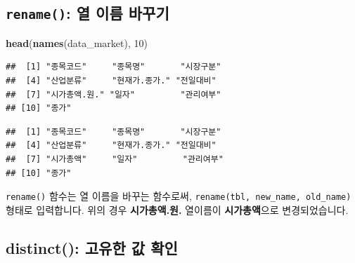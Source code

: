 \documentclass[12pt,]{book}
\newenvironment{Shaded}{\begin{snugshade}}{\end{snugshade}}
\newcommand{\DataTypeTok}[1]{\textcolor[rgb]{0.13,0.29,0.53}{#1}}
\newcommand{\DecValTok}[1]{\textcolor[rgb]{0.00,0.00,0.81}{#1}}
\newcommand{\KeywordTok}[1]{\textcolor[rgb]{0.13,0.29,0.53}{\textbf{#1}}}
\newcommand{\NormalTok}[1]{#1}
\newcommand{\OperatorTok}[1]{\textcolor[rgb]{0.81,0.36,0.00}{\textbf{#1}}}
\newcommand{\StringTok}[1]{\textcolor[rgb]{0.31,0.60,0.02}{#1}}
\begin{document}
\hypertarget{rename---}{%
\subsection{\texorpdfstring{\texttt{rename()}: 열 이름 바꾸기}{rename(): 열 이름 바꾸기}}\label{rename---}}

\begin{Shaded}
\begin{Highlighting}[]
\KeywordTok{head}\NormalTok{(}\KeywordTok{names}\NormalTok{(data_market), }\DecValTok{10}\NormalTok{)}
\end{Highlighting}
\end{Shaded}

\begin{verbatim}
##  [1] "종목코드"     "종목명"       "시장구분"    
##  [4] "산업분류"     "현재가.종가." "전일대비"    
##  [7] "시가총액.원." "일자"         "관리여부"    
## [10] "종가"
\end{verbatim}

\begin{Shaded}
\end{Shaded}

\begin{verbatim}
##  [1] "종목코드"     "종목명"       "시장구분"    
##  [4] "산업분류"     "현재가.종가." "전일대비"    
##  [7] "시가총액"     "일자"         "관리여부"    
## [10] "종가"
\end{verbatim}

\texttt{rename()} 함수는 열 이름을 바꾸는 함수로써, \texttt{rename(tbl,\ new\_name,\ old\_name)} 형태로 입력합니다. 위의 경우 \textbf{시가총액.원.} 열이름이 \textbf{시가총액}으로 변경되었습니다.

\hypertarget{distinct---}{%
\subsection{distinct(): 고유한 값 확인}\label{distinct---}}

\begin{Shaded}
\end{Shaded}
\end{document}
